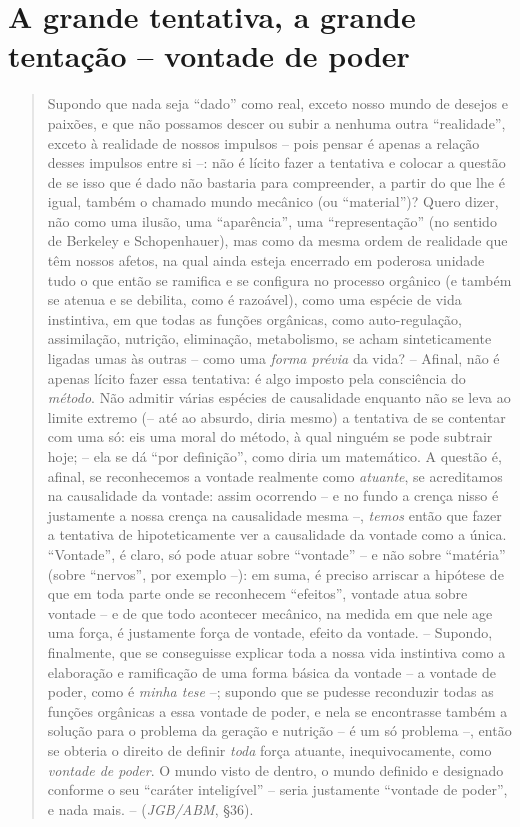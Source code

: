 \documentclass[
	12pt,				%
	openright,			%
	oneside,			%
	a4paper,			%
	english,			%
	french,				%
	spanish,			%
	brazil				%
	]{abntex2}
\begin{document}
\section{A grande tentativa, a grande tentação -- vontade de poder}

\begin{quotation}
Supondo que nada seja “dado” como real, exceto nosso mundo de desejos e paixões, e que não possamos descer ou subir a nenhuma outra “realidade”, exceto à realidade de nossos impulsos – pois pensar é apenas a relação desses impulsos entre si –: não é lícito fazer a tentativa e colocar a questão de se isso que é dado não bastaria para compreender, a partir do que lhe é igual, também o chamado mundo mecânico (ou “material”)? Quero dizer, não como uma ilusão, uma “aparência”, uma “representação” (no sentido de Berkeley e Schopenhauer), mas como da mesma ordem de realidade que têm nossos afetos, na qual ainda esteja encerrado em poderosa unidade tudo o que então se ramifica e se configura no processo orgânico (e também se atenua e se debilita, como é razoável), como uma espécie de vida instintiva, em que todas as funções orgânicas, como auto-regulação, assimilação, nutrição, eliminação, metabolismo, se acham sinteticamente ligadas umas às outras – como uma \textit{forma prévia} da vida? – Afinal, não é apenas lícito fazer essa tentativa: é algo imposto pela consciência do \textit{método}. Não admitir várias espécies de causalidade enquanto não se leva ao limite extremo (– até ao absurdo, diria mesmo) a tentativa de se contentar com uma só: eis uma moral do método, à qual ninguém se pode subtrair hoje; – ela se dá “por definição”, como diria um matemático. A questão é, afinal, se reconhecemos a vontade realmente como \textit{atuante}, se acreditamos na causalidade da vontade: assim ocorrendo – e no fundo a crença nisso é justamente a nossa crença na causalidade mesma –, \textit{temos} então que fazer a tentativa de hipoteticamente ver a causalidade da vontade como a única. “Vontade”, é claro, só pode atuar sobre “vontade” – e não sobre “matéria” (sobre “nervos”, por exemplo –): em suma, é preciso arriscar a hipótese de que em toda parte onde se reconhecem “efeitos”, vontade atua sobre vontade – e de que todo acontecer mecânico, na medida em que nele age uma força, é justamente força de vontade, efeito da vontade. –  Supondo, finalmente, que se conseguisse explicar toda a nossa vida instintiva como a elaboração e ramificação de uma forma básica da vontade – a vontade de poder, como é \textit{minha tese} –; supondo que se pudesse reconduzir todas as funções orgânicas a essa vontade de poder, e nela se encontrasse também a solução para o problema da geração e nutrição – é um só problema –, então se obteria o direito de definir \textit{toda} força atuante, inequivocamente, como \textit{vontade de poder}. O mundo visto de dentro, o mundo definido e designado conforme o seu “caráter inteligível” – seria justamente “vontade de poder”, e nada mais. – (\textit{JGB/ABM}, §36).
\end{quotation}
\end{document}
